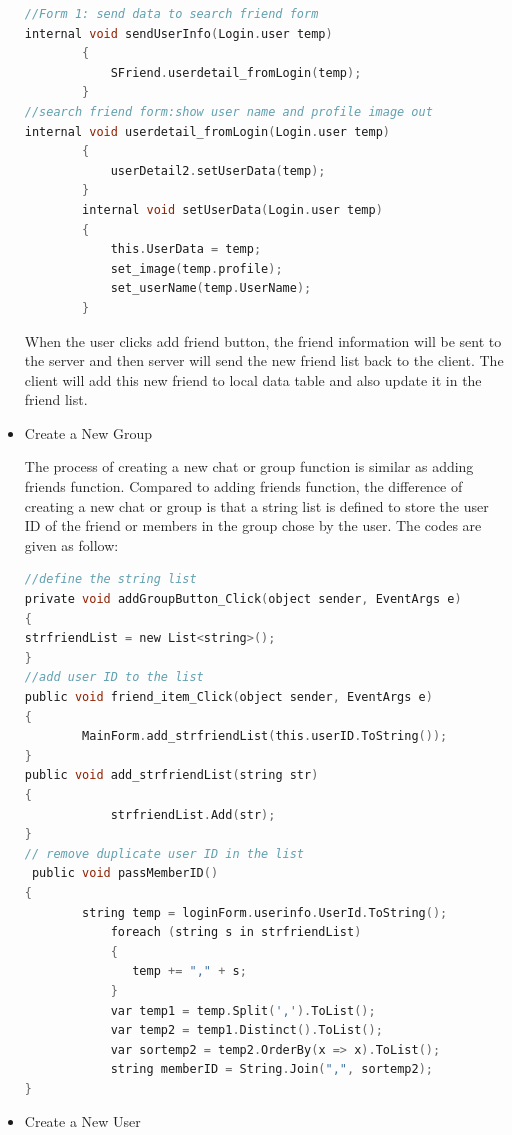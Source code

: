 \documentclass[a4paper,11pt]{article}
\begin{document}
\begin{itemize}
\begin{lstlisting}[language=C]
//Form 1: send data to search friend form
internal void sendUserInfo(Login.user temp)
        {
            SFriend.userdetail_fromLogin(temp);
        }
//search friend form:show user name and profile image out 
internal void userdetail_fromLogin(Login.user temp)
        {
            userDetail2.setUserData(temp);
        }
        internal void setUserData(Login.user temp)
        {
            this.UserData = temp;
            set_image(temp.profile);
            set_userName(temp.UserName);
        }
\end{lstlisting}
When the user clicks add friend button, the friend information will be sent to the server and then server will send the new friend list back to the client. The client will add this new friend to local data table and also update it in the friend list.



\item Create a New Group

The process of creating a new chat or group function is similar as adding friends function. Compared to adding friends function, the difference of creating a new chat or group is that a string list is defined to store the user ID of the friend or members in the group chose by the user. The codes are given as follow:

\begin{lstlisting}[language=C]
//define the string list 
private void addGroupButton_Click(object sender, EventArgs e)
{
strfriendList = new List<string>();
}
//add user ID to the list
public void friend_item_Click(object sender, EventArgs e)
{
        MainForm.add_strfriendList(this.userID.ToString());
}
public void add_strfriendList(string str)
{
            strfriendList.Add(str);                   
}
// remove duplicate user ID in the list 
 public void passMemberID()
{
        string temp = loginForm.userinfo.UserId.ToString();
            foreach (string s in strfriendList)
            {
               temp += "," + s;                
            }
            var temp1 = temp.Split(',').ToList();
            var temp2 = temp1.Distinct().ToList();
            var sortemp2 = temp2.OrderBy(x => x).ToList();
            string memberID = String.Join(",", sortemp2);
}

\end{lstlisting}

\item Create a New User


\end{itemize}
\end{document}
